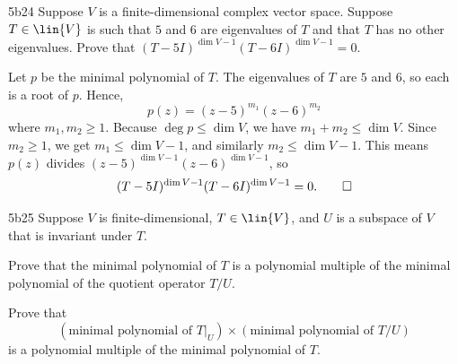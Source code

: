 \begin{exercise}{5b24}
    Suppose $V$ is a finite-dimensional complex vector space.
	Suppose $T \in \lin{V}$ is such that $5$ and $6$ are eigenvalues of $T$ and that $T$ has no other eigenvalues.
	Prove that $(T - 5I)^{\dim V - 1}(T - 6I)^{\dim V - 1} = 0$.
\end{exercise}

\begin{sol}
    Let $p$ be the minimal polynomial of $T$. The eigenvalues of $T$ are $5$ and $6$, so each is a root of $p$.
    Hence,
    \[
    	p(z) = (z - 5)^{m_1}(z - 6)^{m_2}
    \]
    where $m_1, m_2 \geq 1$.
    Because $\deg p \leq \dim V$, we have $m_1 + m_2 \leq \dim V$.
    Since $m_2 \geq 1$, we get $m_1 \leq \dim V - 1$, and similarly $m_2 \leq \dim V - 1$.
    This means $p(z)$ divides $(z - 5)^{\dim V - 1}(z - 6)^{\dim V - 1}$, so
    \[
    	(T - 5I)^{\dim V - 1}(T - 6I)^{\dim V - 1} = 0. \qedhere
    \]
\end{sol}

\begin{exercise}{5b25}
    Suppose $V$ is finite-dimensional, $T \in \lin{V}$, and $U$ is a subspace of $V$ that is invariant under $T$.
    \begin{subexercises}
        \item Prove that the minimal polynomial of $T$ is a polynomial multiple of the minimal polynomial of the quotient operator $T / U$.
        \item Prove that
        \[
        	(\text{minimal polynomial of } T|_U) \times (\text{minimal polynomial of } T / U)
        \]
        is a polynomial multiple of the minimal polynomial of $T$.
    \end{subexercises}
\end{exercise}

